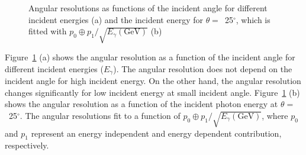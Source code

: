\documentclass[preprint,12pt,times,a4paper]{elsarticle}
\begin{document}
\begin{figure}[!hbt]
\centering
{}
\caption{ Angular resolutions as functions of the incident angle for different incident energies (a) and the incident energy for $\theta=$~25$^{\circ}$, which is fitted with $p_{0} \oplus p_{1}/\sqrt{E_{\gamma}(\mathrm{GeV})}$ (b) }
\label{fig:angle_reco_dep_gr}
\end{figure}

Figure~\ref{fig:angle_reco_dep_gr} (a) shows the angular resolution as a function of the incident angle for different incident energies ($E_{\gamma}$). The angular resolution does not depend on the incident angle for high incident energy. On the other hand, the angular resolution changes significantly for low incident energy at small incident angle. Figure~\ref{fig:angle_reco_dep_gr} (b) shows the angular resolution as a function of the incident photon energy at $\theta=$~25$^{\circ}$. The angular resolutions fit to a function of $p_{0} \oplus p_{1}/\sqrt{E_{\gamma}(\mathrm{GeV})}$, where $p_{0}$ and $p_{1}$ represent an energy independent and energy dependent contribution, respectively.
\end{document}

